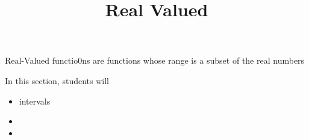 \documentclass{ximera}
\title{Real Valued}
\begin{document}
\begin{abstract}
\end{abstract}
\maketitle





Real-Valued functio0ns are functions whose range is a subset of the real numbers





\begin{sectionOutcomes}
In this section, students will 

\begin{itemize}
\item intervals
\item 
\item 
\end{itemize}
\end{sectionOutcomes}
\end{document}
